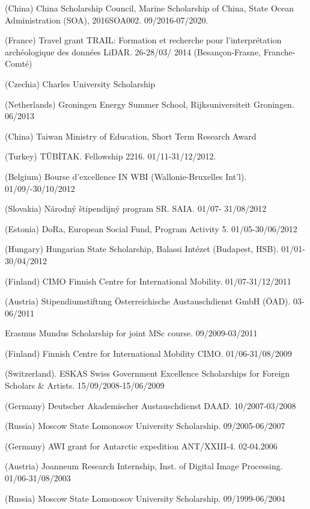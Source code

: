 \documentclass[10pt]{article}
\renewcommand{\section}[2]%
        {\pagebreak[2]\vspace{1.3\baselineskip}%
         \phantomsection\addcontentsline{toc}{section}{#1}%
         \hspace{0in}%
         \marginpar{
         \raggedright \scshape #1}#2}
\newenvironment{innerlist}[1][\enskip\textbullet]%
        {\begin{compactitem}[#1]}{\end{compactitem}}
\begin{document}
\pagebreak

\section{Grants}

\begin{innerlist}
	\item	(China) China Scholarship Council, Marine Scholarship of China, State Ocean Administration (SOA), 2016SOA002. 09/2016-07/2020. 
	\item (France) Travel grant TRAIL: Formation et recherche pour l'interpr\'etation arch\'eologique des donn\'ees LiDAR. 26-28/03/ 2014 (Besançon-Frasne, Franche-Comté)
	\item (Czechia) Charles University Scholarship
	\item (Netherlands) Groningen Energy Summer School, Rijksuniversiteit Groningen. 06/2013
	\item (China) Taiwan Ministry of Education, Short Term Research Award
	\item (Turkey) T\"{U}B\.{I}TAK. Fellowship 2216. 01/11-31/12/2012.
	\item (Belgium) Bourse d'excellence IN WBI (Wallonie-Bruxelles Int'l). 01/09/-30/10/2012
	\item (Slovakia) N\'{a}rodn\'{y} \v{s}tipendijn\'{y} program SR. SAIA. 01/07- 31/08/2012
	\item (Estonia) DoRa, European Social Fund, Program Activity 5. 01/05-30/06/2012
	\item (Hungary) Hungarian State Scholarship, Balassi Int\'{e}zet (Budapest, HSB). 01/01-30/04/2012
	\item (Finland) CIMO Finnish Centre for International Mobility. 01/07-31/12/2011
	\item (Austria) Stipendiumstiftung \"{O}sterreichische Austauschdienst GmbH (\"{O}AD). 03-06/2011 
	\item Erasmus Mundus Scholarship for joint MSc course. 09/2009-03/2011
	\item (Finland) Finnish Centre for International Mobility CIMO. 01/06-31/08/2009
	\item (Switzerland). ESKAS Swiss Government Excellence Scholarships for Foreign Scholars \& Artists. 15/09/2008-15/06/2009
	\item (Germany) Deutscher Akademischer Austauschdienst DAAD. 10/2007-03/2008
	\item (Russia) Moscow State Lomonosov University Scholarship. 09/2005-06/2007
	\item (Germany) AWI grant for Antarctic expedition ANT/XXIII-4. 02-04.2006
	\item (Austria) Joanneum Research Internship, Inst. of Digital Image Processing. 01/06-31/08/2003
	\item (Russia) Moscow State Lomonosov University Scholarship. 09/1999-06/2004
\end{innerlist}	
\end{document}

